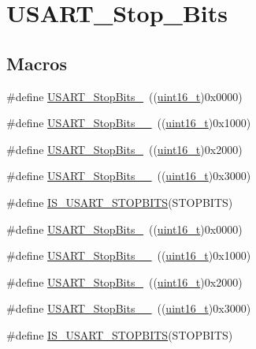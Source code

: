 \hypertarget{group___u_s_a_r_t___stop___bits}{}\section{U\+S\+A\+R\+T\+\_\+\+Stop\+\_\+\+Bits}
\label{group___u_s_a_r_t___stop___bits}
\subsection*{Macros}
\begin{DoxyCompactItemize}
\item 
\#define \hyperlink{group___u_s_a_r_t___stop___bits_gae2cb35620ba001f0d63e9e0be93e4a05}{U\+S\+A\+R\+T\+\_\+\+Stop\+Bits\+\_}~((\hyperlink{_p_e___types_8h_a1f1825b69244eb3ad2c7165ddc99c956}{uint16\+\_\+t})0x0000)
\item 
\#define \hyperlink{group___u_s_a_r_t___stop___bits_ga2ad06e3acfb691735d05ab9a314e2e32}{U\+S\+A\+R\+T\+\_\+\+Stop\+Bits\+\_\+\_}~((\hyperlink{_p_e___types_8h_a1f1825b69244eb3ad2c7165ddc99c956}{uint16\+\_\+t})0x1000)
\item 
\#define \hyperlink{group___u_s_a_r_t___stop___bits_ga652058b6be2f48ac0d82d0e75537fc81}{U\+S\+A\+R\+T\+\_\+\+Stop\+Bits\+\_}~((\hyperlink{_p_e___types_8h_a1f1825b69244eb3ad2c7165ddc99c956}{uint16\+\_\+t})0x2000)
\item 
\#define \hyperlink{group___u_s_a_r_t___stop___bits_ga30897cc46d5b3790a9b14ffaba354527}{U\+S\+A\+R\+T\+\_\+\+Stop\+Bits\+\_\+\_}~((\hyperlink{_p_e___types_8h_a1f1825b69244eb3ad2c7165ddc99c956}{uint16\+\_\+t})0x3000)
\item 
\#define \hyperlink{group___u_s_a_r_t___stop___bits_ga6f9153c1fbee1058ba26ec88f0f20828}{I\+S\+\_\+\+U\+S\+A\+R\+T\+\_\+\+S\+T\+O\+P\+B\+I\+TS}(S\+T\+O\+P\+B\+I\+TS)
\item 
\#define \hyperlink{group___u_s_a_r_t___stop___bits_gae2cb35620ba001f0d63e9e0be93e4a05}{U\+S\+A\+R\+T\+\_\+\+Stop\+Bits\+\_}~((\hyperlink{_p_e___types_8h_a1f1825b69244eb3ad2c7165ddc99c956}{uint16\+\_\+t})0x0000)
\item 
\#define \hyperlink{group___u_s_a_r_t___stop___bits_ga2ad06e3acfb691735d05ab9a314e2e32}{U\+S\+A\+R\+T\+\_\+\+Stop\+Bits\+\_\+\_}~((\hyperlink{_p_e___types_8h_a1f1825b69244eb3ad2c7165ddc99c956}{uint16\+\_\+t})0x1000)
\item 
\#define \hyperlink{group___u_s_a_r_t___stop___bits_ga652058b6be2f48ac0d82d0e75537fc81}{U\+S\+A\+R\+T\+\_\+\+Stop\+Bits\+\_}~((\hyperlink{_p_e___types_8h_a1f1825b69244eb3ad2c7165ddc99c956}{uint16\+\_\+t})0x2000)
\item 
\#define \hyperlink{group___u_s_a_r_t___stop___bits_ga30897cc46d5b3790a9b14ffaba354527}{U\+S\+A\+R\+T\+\_\+\+Stop\+Bits\+\_\+\_}~((\hyperlink{_p_e___types_8h_a1f1825b69244eb3ad2c7165ddc99c956}{uint16\+\_\+t})0x3000)
\item 
\#define \hyperlink{group___u_s_a_r_t___stop___bits_ga6f9153c1fbee1058ba26ec88f0f20828}{I\+S\+\_\+\+U\+S\+A\+R\+T\+\_\+\+S\+T\+O\+P\+B\+I\+TS}(S\+T\+O\+P\+B\+I\+TS)
\end{DoxyCompactItemize}


